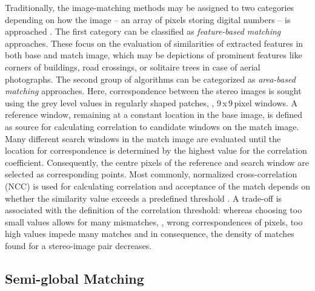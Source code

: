 Traditionally, the image-matching methods 
may be assigned to two categories depending
on how the image -- an array of pixels storing digital numbers -- is approached \parencite{ERDAS.2010, Gruen.2012}.
The first category can be classified as \emph{feature-based matching} approaches. 
These focus on the evaluation of similarities 
of extracted features in both base and match image, which may be depictions of prominent features like corners of buildings, road crossings,
or solitaire trees in case of aerial photographs.
The second group of algorithms can be categorized as \emph{area-based matching} approaches.
Here, correspondence between the stereo images is sought using the grey level values in regularly shaped patches, \eg, 9\,x\,9\,pixel windows. 
A reference window, remaining at a constant location in the base image, is defined as source for calculating correlation to 
candidate windows on the match image. Many different search windows in the match image are evaluated until the location for correspondence is
determined by the highest value for the correlation coefficient. 
Consequently, the centre pixels of the reference and search window are selected as corresponding points.
Most commonly, normalized cross-correlation (NCC) is used for calculating correlation and acceptance of the match 
depends on whether the similarity value exceeds a predefined threshold \parencite{Lemmens.2011b}. 
A trade-off is associated with the definition of the correlation threshold: whereas choosing too small values allows for many mismatches, \ie,
wrong correspondences of pixels, too high values impede many matches and in consequence, the density of matches found for a stereo-image pair decreases.

\subsection{Semi-global Matching}

